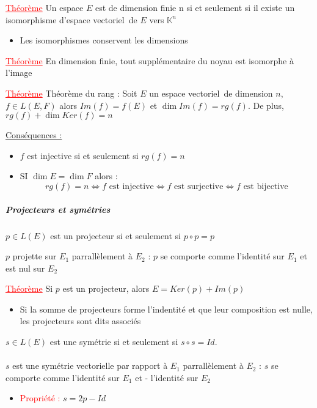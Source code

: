 \documentclass[a4paper, french]{article}
\newcommand{\K}{\mathbb{K}}
\newcommand{\ev}{espace vectoriel}
\newcommand{\thm}{\textcolor{red}{\underline{Théorème} }}
\newcommand{\ppt}{\textcolor{red}{Propriété : }}
\begin{document}
	 \thm Un espace $E$ est de dimension finie n si et seulement si il existe un isomorphisme d'\ev \, de $E$ vers $\K^n$
	
	 \begin{itemize}[label=\(\bullet\)]
	  \item Les isomorphismes conservent les dimensions
	\end{itemize}

	 \thm En dimension finie, tout supplémentaire du noyau est isomorphe à l'image 
	 
	 \thm Théorème du rang : Soit $E$ un \ev \, de dimension $n$, $f\in L(E,F)$ alors $Im(f)=f(E)$ et $\dim Im(f)=rg(f)$. De plus, $rg(f)+\dim Ker(f)=n$ 
	 
	 \underline{Conséquences :}
	\begin{itemize}[label=\(\bullet\)]
 		\item $f$ est injective si et seulement si $rg(f)=n$
 		\item SI $\dim E = \dim F$ alors :
				 $$rg(f)=n \iff f \text{ est injective} \iff f \text{ est surjective} \iff f \text{ est bijective}$$
	\end{itemize}
	
	\subparagraph{Projecteurs et symétries 
	 }
	
	$p \in L(E)$ est un projecteur si et seulement si $p\circ p=p$ 
	 
	$p$ projette sur $E_1$ parrallèlement à $E_2$ : $p$ se comporte comme l'identité sur $E_1$ et est nul sur $E_2$ 
	 
	 \thm Si $p$ est un projecteur, alors $E=Ker(p)+Im(p)$
	
	 \begin{itemize}[label=\(\bullet\)]
 		\item Si la somme de projecteurs forme l'indentité et que leur composition est nulle, les projecteurs sont dits associés
	\end{itemize}

	$s \in L(E)$ est une symétrie si et seulement si $s\circ s=Id$.
	\paragraph*{}
	$s$ est une symétrie vectorielle par rapport à $E_1$ parrallèlement à $E_2$ : $s$ se comporte comme l'identité sur $E_1$ et - l'identité sur $E_2$ 
	 
	
	\begin{itemize}[label=\(\bullet\)]
 		\item\ppt $s=2p-Id$
	\end{itemize}
\end{document}
